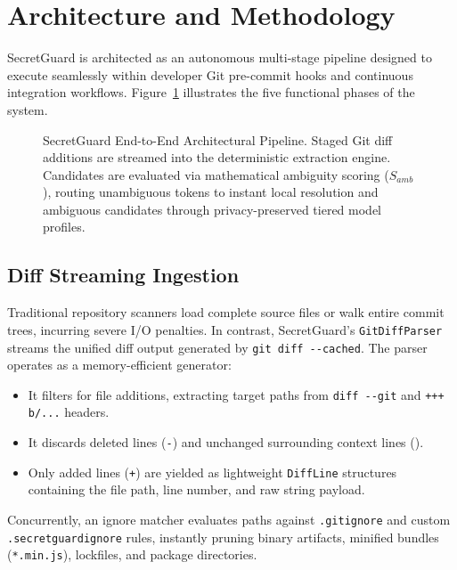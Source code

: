 \section{Architecture and Methodology}
\label{sec:method}

SecretGuard is architected as an autonomous multi-stage pipeline designed to execute seamlessly within developer Git pre-commit hooks and continuous integration workflows. Figure~\ref{fig:architecture} illustrates the five functional phases of the system.

\begin{figure}[t]
\centering

\caption{SecretGuard End-to-End Architectural Pipeline. Staged Git diff additions are streamed into the deterministic extraction engine. Candidates are evaluated via mathematical ambiguity scoring ($S_{amb}$), routing unambiguous tokens to instant local resolution and ambiguous candidates through privacy-preserved tiered model profiles.}
\label{fig:architecture}
\end{figure}

\subsection{Diff Streaming Ingestion}
Traditional repository scanners load complete source files or walk entire commit trees, incurring severe I/O penalties. In contrast, SecretGuard's \texttt{GitDiffParser} streams the unified diff output generated by \texttt{git diff -{}-cached}. The parser operates as a memory-efficient generator:
\begin{itemize}
    \item It filters for file additions, extracting target paths from \texttt{diff -{}-git} and \texttt{+++ b/...} headers.
    \item It discards deleted lines (\texttt{-}) and unchanged surrounding context lines (\texttt{\phantom{+}}).
    \item Only added lines (\texttt{+}) are yielded as lightweight \texttt{DiffLine} structures containing the file path, line number, and raw string payload.
\end{itemize}
Concurrently, an ignore matcher evaluates paths against \texttt{.gitignore} and custom \texttt{.secretguardignore} rules, instantly pruning binary artifacts, minified bundles (\texttt{*.min.js}), lockfiles, and package directories.

